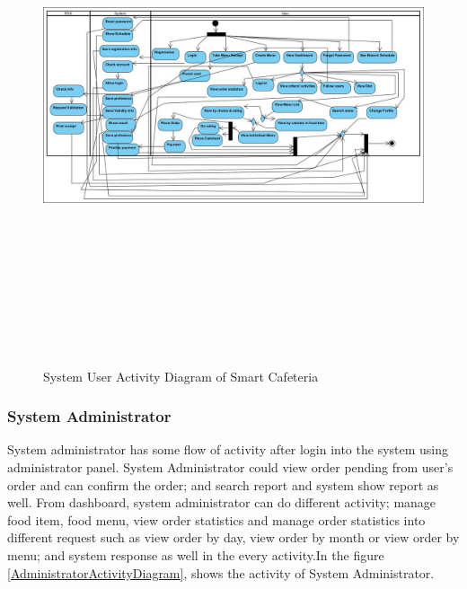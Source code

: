 \begin{figure}[h!t]
    \centering
      \includegraphics[width=6in,height=6in]{ch3/ActivityDiagram/SystemUser}
  \caption{System User Activity Diagram of Smart Cafeteria}
  \label{SystemUserActivityDiagram}
\end{figure}

\subsubsection{System Administrator} System administrator has some flow of activity
after login into the system using administrator panel. System Administrator
could view order pending from user's order and can confirm the order; and
search report and system show report as well. From dashboard, system
administrator can do different activity; manage food item, food menu, view order
statistics and manage order statistics into different request such as view order
by day, view order by month or view order by menu; and system response as well
in the every activity.In the figure \ref{AdministratorActivityDiagram}, shows
the activity of System Administrator.

